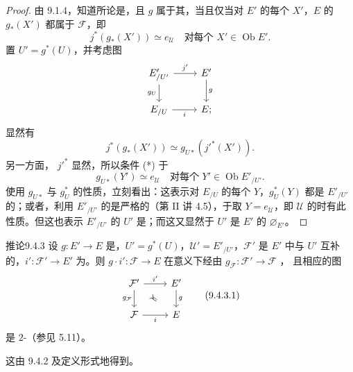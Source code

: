 \begin{proof}
由 9.1.4，知道所论是，且 $g$ 属于其，当且仅当对 $E'$ 的每个 $X'$，$E$ 的 $g_*(X')$ 都属于 $\mathcal F$，即
\[
j^*(g_*(X'))\simeq e_{\mathcal U}\quad\text{对每个 }X'\in\operatorname{Ob}E'.\tag{*}
\]
置 $U'=g^*(U)$，并考虑图
\[
\begin{tikzcd}
E'_{/U'}\arrow[r,"j'"]\arrow[d,"g_U"']&E'\arrow[d,"g"]\\
E_{/U}\arrow[r,"i"']&E;
\end{tikzcd}
\]
显然有
\[
j^*(g_*(X'))\simeq g_{U*}(j'^*(X')).
\]
另一方面， $j'^*$ 显然，所以条件 (*) 于
\[
g_{U*}(Y')\simeq e_{\mathcal U}\quad\text{对每个 }Y'\in\operatorname{Ob}E'_{/U'}.\tag{**}
\]
使用 $g_{U*}$ 与 $g_U^*$ 的性质，立刻看出：这表示对 $E_{/U}$ 的每个 $Y$，$g_U^*(Y)$ 都是 $E'_{/U'}$ 的；或者，利用 $E'_{/U'}$ 的是严格的（第 II 讲 4.5），于取 $Y=e_{\mathcal U}$，即 $\mathcal U$ 的时有此性质。但这也表示 $E'_{/U'}$ 的 $U'$ 是；而这又显然于 $U'$ 是 $E'$ 的 $\varnothing_{E'}$。
\end{proof}
\begin{SGAresult}{推论}{9.4.3}
设 $g:E'\to E$ 是，$U'=g^*(U)$，$\mathcal U'=E'_{/U'}$，$\mathcal F'$ 是 $E'$ 中与 $U'$ 互补的，$i':\mathcal F'\to E'$ 为。则 $g\cdot i':\mathcal F\to E$ 在意义下经由 $g_{\mathcal F}:\mathcal F'\to\mathcal F$ ，
且相应的图
\[
\begin{tikzcd}
\mathcal F'\arrow[r,"i'"]\arrow[d,"g_{\mathcal F}"']\arrow[dr,Rightarrow,shorten <=18pt,shorten >=18pt]&E'\arrow[d,"g"]\\
\mathcal F\arrow[r,"i"']&E
\end{tikzcd}\tag{9.4.3.1}
\]
是 $2$-（参见 5.11）。
\end{SGAresult}
这由 9.4.2 及定义形式地得到。


